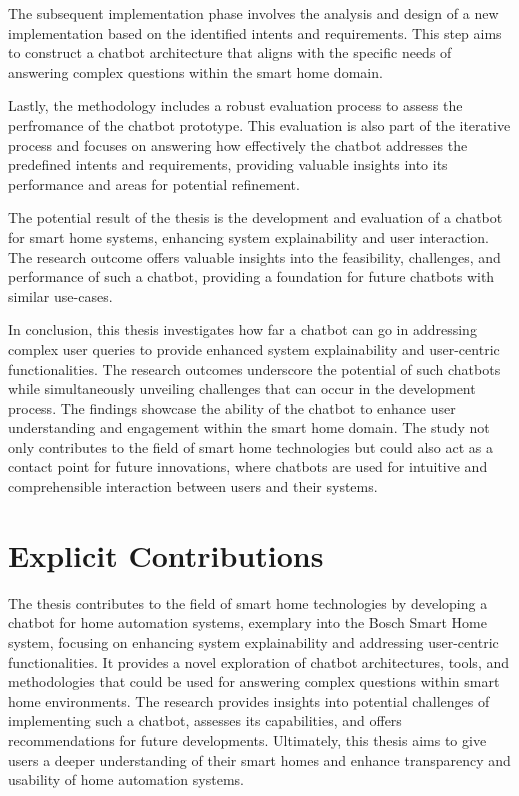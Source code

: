 The subsequent implementation phase involves the analysis and design of a new implementation based on the identified intents and requirements. This step aims to construct a chatbot architecture that aligns with the specific needs of answering complex questions within the smart home domain.

Lastly, the methodology includes a robust evaluation process to assess the perfromance of the chatbot prototype. 
This evaluation is also part of the iterative process and focuses on answering how effectively the chatbot addresses the predefined intents and requirements, providing valuable insights into its performance and areas for potential refinement. 

The potential result of the thesis is the development and evaluation of a chatbot for smart home systems, enhancing system explainability and user interaction. 
The research outcome offers valuable insights into the feasibility, challenges, and performance of such a chatbot, providing a foundation for future chatbots with similar use-cases.

In conclusion, this thesis investigates how far a chatbot can go in addressing complex user queries to provide enhanced system explainability and user-centric functionalities.
The research outcomes underscore the potential of such chatbots while simultaneously unveiling challenges that can occur in the development process.
The findings showcase the ability of the chatbot to enhance user understanding and engagement within the smart home domain. 
The study not only contributes to the field of smart home technologies but could also act as a contact point for future innovations, where chatbots are used for intuitive and comprehensible interaction between users and their systems.

\section*{Explicit Contributions}
The thesis contributes to the field of smart home technologies by developing a chatbot for home automation systems, exemplary into the Bosch Smart Home system, focusing on enhancing system explainability and addressing user-centric functionalities. 
It provides a novel exploration of chatbot architectures, tools, and methodologies that could be used for answering complex questions within smart home environments. 
The research provides insights into potential challenges of implementing such a chatbot, assesses its capabilities, and offers recommendations for future developments. 
Ultimately, this thesis aims to give users a deeper understanding of their smart homes and enhance transparency and usability of home automation systems.
